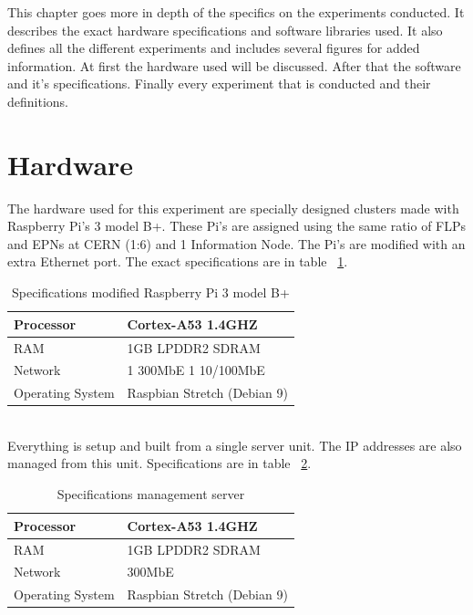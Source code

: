 This chapter goes more in depth of the specifics on the experiments conducted. It describes the exact hardware specifications and software libraries used. It also defines all the different experiments and includes several figures for added information. At first the hardware used will be discussed. After that the software and it's specifications. Finally every experiment that is conducted and their definitions.
\section{Hardware}
The hardware used for this experiment are specially designed clusters made with Raspberry Pi's 3 model B+. These Pi's are assigned using the same ratio of FLPs and EPNs at CERN (1:6) and 1 Information Node. The Pi's are modified with an extra Ethernet port. The exact specifications are in table ~\ref{table:RaspberrySpecifications}.

\begin{table}[htb]
\begin{tabular}{| l | l |}
\hline
Processor & Cortex-A53 1.4GHZ\\ \hline
RAM & 1GB LPDDR2 SDRAM\\ \hline
Network & 1 300MbE 1 10/100MbE \\ \hline
Operating System & Raspbian Stretch (Debian 9)\\ \hline
\end{tabular}
\caption{Specifications modified Raspberry Pi 3 model B+}
\label{table:RaspberrySpecifications}
\end{table}

~\\ Everything is setup and built from a single server unit. The IP addresses are also managed from this unit. Specifications are in table ~\ref{table:ManagementSpecifications}.

\begin{table}[htb]
\begin{tabular}{| l | l |}
\hline
Processor & Cortex-A53 1.4GHZ\\ \hline
RAM & 1GB LPDDR2 SDRAM\\ \hline
Network & 300MbE\\ \hline
Operating System & Raspbian Stretch (Debian 9)\\ \hline
\end{tabular}
\caption{Specifications management server}
\label{table:ManagementSpecifications}
\end{table}

